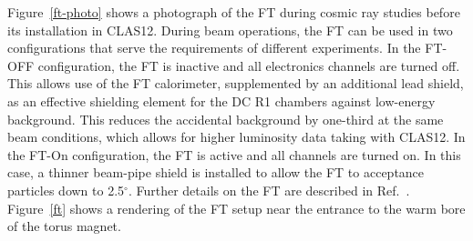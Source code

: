 \documentclass[final,3p,twocolumn]{elsarticle}
\begin{document}
Figure~\ref{ft-photo} shows a photograph of the FT during cosmic ray studies before its installation in CLAS12.
During beam operations, the FT can be used in two configurations that serve the requirements of different
experiments. In the FT-OFF configuration, the FT is inactive and all electronics channels are turned off. This
allows use of the FT calorimeter, supplemented by an additional lead shield, as an effective shielding element for
the DC R1 chambers against low-energy background. This reduces the accidental background by one-third at the
same beam conditions, which allows for higher luminosity data taking with CLAS12. In the FT-On configuration, the
FT is active and all channels are turned on. In this case, a thinner beam-pipe shield is installed to allow the FT
to acceptance particles down to 2.5$^\circ$. Further details on the FT are described in Ref.~\cite{FT}.
Figure~\ref{ft} shows a rendering of the FT setup near the entrance to the warm bore of the torus magnet.   
\end{document}
